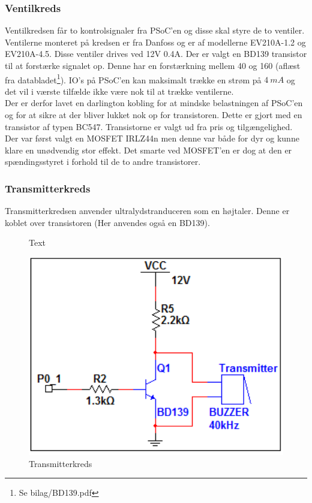 \subsubsection{Ventilkreds}
Ventilkredsen får to kontrolsignaler fra PSoC'en og disse skal styre de to ventiler. Ventilerne monteret på kredsen er fra Danfoss og er af modellerne EV210A-1.2 og EV210A-4.5. Disse ventiler drives ved 12V 0.4A. Der er valgt en BD139 transistor til at forstærke signalet op. Denne har en forstærkning mellem 40 og 160 (aflæst fra databladet\footnote{Se bilag/BD139.pdf}). IO's på PSoC'en kan maksimalt trække en strøm på $\SI{4}{mA}$ og det vil i værste tilfælde ikke være nok til at trække ventilerne.\\
Der er derfor lavet en darlington kobling for at mindske belastningen af PSoC'en og for at sikre at der bliver lukket nok op for transistoren. Dette er gjort med en transistor af typen BC547. Transistorne er valgt ud fra pris og tilgængelighed. Der var først valgt en MOSFET IRLZ44n men denne var både for dyr og kunne klare en unødvendig stor effekt. Det smarte ved MOSFET'en er dog at den er spændingsstyret i forhold til de to andre transistorer. 
\subsubsection{Transmitterkreds}
Transmitterkredsen anvender ultralydstranduceren som en højtaler. Denne er koblet over transistoren (Her anvendes også en BD139).\\
\newpage
\begin{figure}[H]
\begin{minipage}[l]{0.45\textwidth}
Text
\end{minipage}
\begin{minipage}[r]{0.45\textwidth}
\centering
\includegraphics[width = 1\textwidth]{billeder/transmitterkreds}
\caption{Transmitterkreds}
\end{minipage}
\end{figure}
